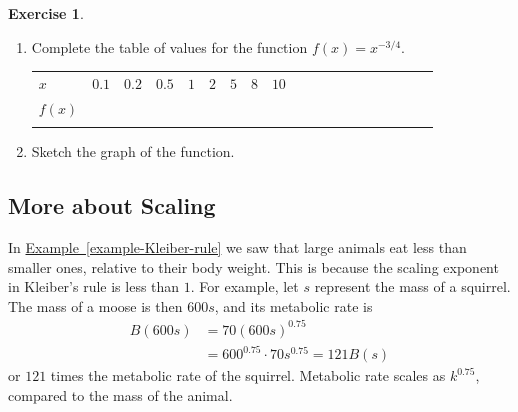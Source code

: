 \documentclass[10pt,]{book}
\theoremstyle{plain}
\theoremstyle{definition}
\theoremstyle{definition}
\theoremstyle{definition}
\theoremstyle{definition}
\theoremstyle{definition}
\newtheorem{exercise}[theorem]{Exercise}
\numberwithin{equation}{section}
\newcommand{\hrulethin}  {\noalign{\hrule height 0.04em}}
\newcommand{\hrulethick} {\noalign{\hrule height 0.11em}}
\newcommand{\amp}{ & }
\begin{document}
\begin{exercise}\label{exercise-power-function}
\leavevmode%
\begin{enumerate}[label=*\alph**]
\item\hypertarget{li-533}{}Complete the table of values for the function \(f (x) = x^{−3/4}\).
    \leavevmode%
\begin{table}
\centering
\begin{tabular}{AcAcAcAcAcAcAcAcAcA}\hrulethick
\(x\)&\(0.1\)&\(0.2\)&\(0.5\)&\(1\)&\(2\)&\(5\)&\(8\)&\(10\)\tabularnewline\hrulethin
\(f (x)\)&\(\)&\(\)&\(\)&\(\)&\(\)&\(\)&\(\)&\(\)\tabularnewline\hrulethin
\end{tabular}
\end{table}
\item\hypertarget{li-534}{}Sketch the graph of the function.\end{enumerate}
\end{exercise}
\typeout{************************************************}
\typeout{************************************************}
\subsection[More about Scaling]{More about Scaling}\label{subsection-77}

    In \hyperref[example-Kleiber-rule]{Example~\ref{example-Kleiber-rule}} we saw that large animals eat less than smaller ones, relative to their body weight. This is because the scaling exponent in Kleiber's rule is less than \(1\). For example, let \(s\) represent the mass of a squirrel. The mass of a moose is then \(600s\), and its metabolic rate is
    \begin{align*}
    B(600s) \amp = 70(600s)^{0.75} \\
    \amp = 600^{0.75} \cdot 70s^{0.75} = 121B(s)
    \end{align*}
    or \(121\) times the metabolic rate of the squirrel. Metabolic rate scales as \(k^{0.75}\), compared to the mass of the animal.
%
\par
\end{document}
